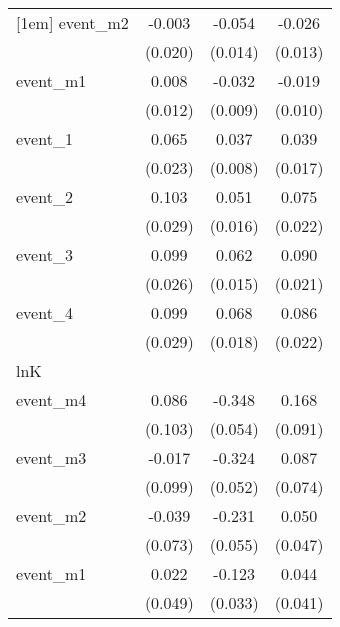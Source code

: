 {\begin{tabular}{l*{3}{c}}
[1em]
event\_m2    &      -0.003         &      -0.054\sym{***}&      -0.026\sym{*}  \\
            &     (0.020)         &     (0.014)         &     (0.013)         \\
[1em]
event\_m1    &       0.008         &      -0.032\sym{***}&      -0.019         \\
            &     (0.012)         &     (0.009)         &     (0.010)         \\
[1em]
event\_1     &       0.065\sym{**} &       0.037\sym{***}&       0.039\sym{*}  \\
            &     (0.023)         &     (0.008)         &     (0.017)         \\
[1em]
event\_2     &       0.103\sym{***}&       0.051\sym{**} &       0.075\sym{***}\\
            &     (0.029)         &     (0.016)         &     (0.022)         \\
[1em]
event\_3     &       0.099\sym{***}&       0.062\sym{***}&       0.090\sym{***}\\
            &     (0.026)         &     (0.015)         &     (0.021)         \\
[1em]
event\_4     &       0.099\sym{***}&       0.068\sym{***}&       0.086\sym{***}\\
            &     (0.029)         &     (0.018)         &     (0.022)         \\
\hline
lnK         &                     &                     &                     \\
event\_m4    &       0.086         &      -0.348\sym{***}&       0.168         \\
            &     (0.103)         &     (0.054)         &     (0.091)         \\
[1em]
event\_m3    &      -0.017         &      -0.324\sym{***}&       0.087         \\
            &     (0.099)         &     (0.052)         &     (0.074)         \\
[1em]
event\_m2    &      -0.039         &      -0.231\sym{***}&       0.050         \\
            &     (0.073)         &     (0.055)         &     (0.047)         \\
[1em]
event\_m1    &       0.022         &      -0.123\sym{***}&       0.044         \\
            &     (0.049)         &     (0.033)         &     (0.041)         \\

\end{tabular}}
